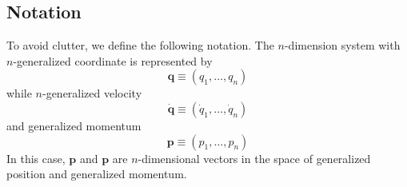 \documentclass[../../../main.tex]{subfiles}
\begin{document}
\subsection*{Notation}
To avoid clutter, we define the following notation.
The $n$-dimension system with $n$-generalized coordinate is represented by
\begin{equation*}
	\mathbf{q}\equiv(q_1,\dots,q_n)
\end{equation*}
while $n$-generalized velocity
\begin{equation*}
	\dot{\mathbf{q}}\equiv(\dot{q}_1,\dots,\dot{q}_n)
\end{equation*}
and generalized momentum
\begin{equation*}
	\mathbf{p}\equiv(p_1,\dots,p_n)
\end{equation*}
In this case, $\mathbf{p}$ and $\mathbf{p}$ are $n$-dimensional vectors in the space of generalized position and generalized momentum.
\end{document}
